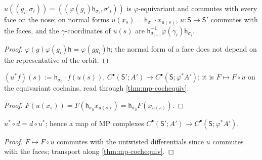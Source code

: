 \begin{lemma}\label{lem:mp-morph-simplicial}
  \leanok
  $u((g_i,\sigma_i))=((\varphi(g_i)\mathsf h_{\sigma_i},\sigma'_i))$ is $\varphi$-equivariant and commutes with every face on the nose; on
  normal forms $u(x_s)=\mathsf h_{\sigma_0}\cdot x_{u(s)}$, $u\colon\mathsf S\to\mathsf S'$ commutes with the faces, and the $\gamma$-coordinates of
  $u(s)$ are $\mathsf h_{\sigma_{i-1}}^{-1}\varphi(\gamma_i)\mathsf h_{\sigma_i}$.
\end{lemma}
\begin{proof}
  \leanok
  $\varphi(g)\varphi(g_i)\mathsf h=\varphi(gg_i)\mathsf h$; the normal form of a face does not depend on the representative of the orbit.
\end{proof}

\begin{definition}\label{def:mp-pull}
  \leanok
  $(u^*f)(s):=\mathsf h_{\sigma_0}\cdot f(u(s))$, $C^\bullet(\mathsf S';A')\to C^\bullet(\mathsf S;\varphi^*A')$; it is $F\mapsto F\circ u$ on the
  equivariant cochains, read through \ref{thm:mp-cochequiv}.
\end{definition}
\begin{proof}
  \leanok
  $F(u(x_s))=F(\mathsf h_{\sigma_0}x_{u(s)})=\mathsf h_{\sigma_0}F(x_{u(s)})$.
\end{proof}

\begin{theorem}\label{thm:mp-pull-cochain}
  \leanok
  $u^*\circ d=d\circ u^*$; hence a map of MP complexes $C^\bullet(\mathsf S';A')\to C^\bullet(\mathsf S;\varphi^*A')$.
\end{theorem}
\begin{proof}
  \leanok
  $F\mapsto F\circ u$ commutes with the untwisted differentials since $u$ commutes with the faces; transport along
  \ref{thm:mp-cochequiv}.
\end{proof}

